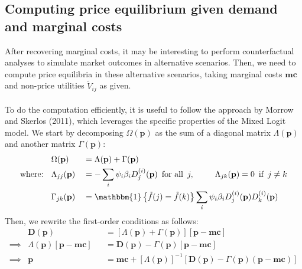 \documentclass[12pt]{article}
\begin{document}
\subsection{Computing price equilibrium given demand and marginal costs}
After recovering marginal costs, it may be interesting to perform counterfactual analyses to simulate market outcomes in alternative scenarios. Then, we need to compute price equilibria in these alternative scenarios, taking marginal costs $\textbf{mc}$ and non-price utilities $\tilde{V}_{ij}$ as given.\\
\\
To do the computation efficiently, it is useful to follow the approach by Morrow and Skerlos (2011), which leverages the specific properties of the Mixed Logit model. We start by decomposing $\Omega(\textbf{p})$ as the sum of a diagonal matrix $\Lambda(\textbf{p})$ and another matrix $\Gamma(\textbf{p})$:
\begin{equation}
\begin{aligned}
	& \Omega(\textbf{p}) && = \Lambda(\textbf{p}) + \Gamma(\textbf{p}) \\
\text{where: } \hspace*{5pt} & \Lambda_{jj}(\textbf{p}) && = - \sum_i \psi_i \beta_i D_j^{(i)}(\textbf{p}) \hspace*{5pt} \text{for all} \hspace*{5pt} j , \hspace*{25pt} \Lambda_{jk}(\textbf{p}) = 0 \hspace*{5pt} \text{if} \hspace*{5pt} j \ne k \\
					 & \Gamma_{jk}(\textbf{p}) && = \mathbbm{1}\left\{ \tilde{f}(j) = \tilde{f}(k)\right\} \sum_i \psi_i \beta_i D_j^{(i)}(\textbf{p}) D_k^{(i)}(\textbf{p})
\end{aligned}
\end{equation}
Then, we rewrite the first-order conditions as follows:
\begin{equation}
\begin{aligned}
	& \textbf{D}(\textbf{p}) && = \left[ \Lambda(\textbf{p}) + \Gamma(\textbf{p}) \right] \left[\textbf{p} - \textbf{mc}\right] \\
	\implies	& \Lambda(\textbf{p}) \left[\textbf{p} - \textbf{mc}\right] && = \textbf{D}(\textbf{p}) - \Gamma(\textbf{p}) \left[\textbf{p} - \textbf{mc}\right] \\
	\implies	& \textbf{p} && = \textbf{mc} +  \left[\Lambda(\textbf{p})\right]^{-1} \left[ \textbf{D}(\textbf{p}) - \Gamma(\textbf{p}) (\textbf{p} - \textbf{mc}) \right] \\
\end{aligned}
\end{equation}
\end{document}
